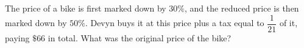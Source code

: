 The price of a bike is first marked down by $30\%$, and the reduced price is then marked down by $50\%$. Devyn buys it at this price plus a tax equal to $\dfrac1{21}$ of it, paying $\$66$ in total. What was the original price of the bike?
